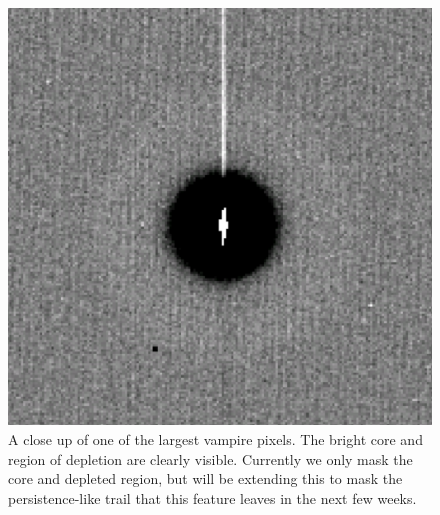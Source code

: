 \begin{figure}
  \begin{center}
  \includegraphics[width=\textwidth]{figures/isr-f03-vampire_pixel.png}
  \caption{A close up of one of the largest vampire pixels.  The bright core and region of depletion are clearly visible.  Currently we only mask the core and depleted region, but will be extending this to mask the persistence-like trail that this feature leaves in the next few weeks.}
  \end{center}
\end{figure}

